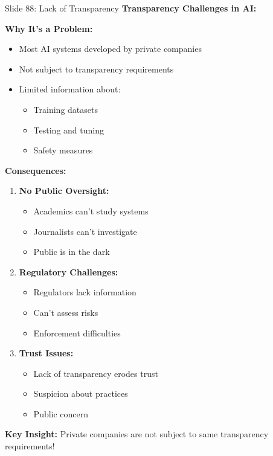 \documentclass[8pt]{beamer}
\begin{document}
	\begin{frame}{Slide 88: Lack of Transparency}
		\fontsize{6.5}{7.5}\selectfont
		\textbf{Transparency Challenges in AI:}
		
		\vspace{0.1cm}
		\textbf{Why It's a Problem:}
		\begin{itemize}
			\item Most AI systems developed by private companies
			\item Not subject to transparency requirements
			\item Limited information about:
			\begin{itemize}
				\item Training datasets
				\item Testing and tuning
				\item Safety measures
			\end{itemize}
		\end{itemize}
		
		\vspace{0.1cm}
		\textbf{Consequences:}
		\begin{enumerate}
			\item \textbf{No Public Oversight:}
			\begin{itemize}
				\item Academics can't study systems
				\item Journalists can't investigate
				\item Public is in the dark
			\end{itemize}
			\item \textbf{Regulatory Challenges:}
			\begin{itemize}
				\item Regulators lack information
				\item Can't assess risks
				\item Enforcement difficulties
			\end{itemize}
			\item \textbf{Trust Issues:}
			\begin{itemize}
				\item Lack of transparency erodes trust
				\item Suspicion about practices
				\item Public concern
			\end{itemize}
		\end{enumerate}
		
		\textcolor{myblue}{\textbf{Key Insight:}} Private companies are \textcolor{myblue}{not subject to same transparency requirements}!
	\end{frame}
	
\end{document}
